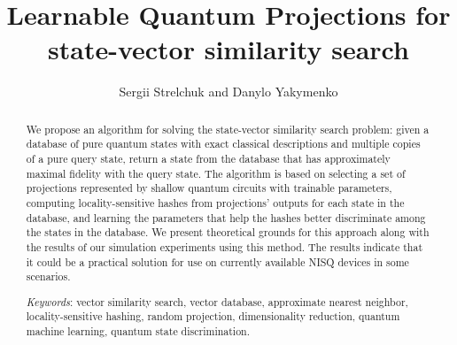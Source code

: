 \documentclass[pra,twocolumn,superscriptaddress,longbibliography]{revtex4-2}
\theoremstyle{remark}
\numberwithin{equation}{section}
\begin{document}
\title{Learnable Quantum Projections for state-vector similarity search}
\author{Sergii Strelchuk and Danylo Yakymenko}
\date{}

\begin{abstract}
We propose an algorithm for solving the state-vector similarity search problem: 
given a database of pure quantum states with exact classical descriptions and multiple copies of a pure query state, 
return a state from the database that has approximately maximal fidelity with the query state. 
The algorithm is based on selecting a set of projections represented by shallow quantum circuits with trainable parameters, 
computing locality-sensitive hashes from projections' outputs for each state in the database, 
and learning the parameters that help the hashes better discriminate among the states in the database. 
We present theoretical grounds for this approach along with the results of our simulation experiments using this method. 
The results indicate that it could be a practical solution for use on currently available NISQ devices in some scenarios.

{\it Keywords}: 
vector similarity search, vector database, approximate nearest neighbor, locality-sensitive hashing,
random projection, dimensionality reduction, quantum machine learning, quantum state discrimination.
\end{abstract}

\maketitle
\end{document}
